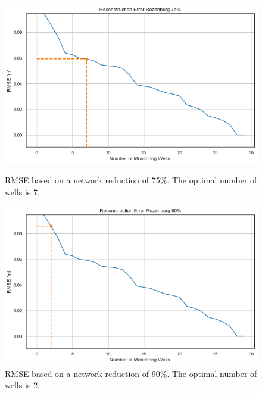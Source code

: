 \begin{figure}[htbp]
    \centering
    \begin{minipage}{0.48\textwidth}
        \includegraphics[width=\linewidth]{figures/res roz/75roz.png}
        \caption{RMSE based on a network reduction of 75\%. The optimal number of wells is 7.}
        \label{roz75}
    \end{minipage}\hfill
    \begin{minipage}{0.48\textwidth}
        \includegraphics[width=\linewidth]{figures/res roz/90roz.png}
        \caption{RMSE based on a network reduction of 90\%. The optimal number of wells is 2.}
        \label{roz90}
    \end{minipage}
\end{figure}


